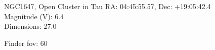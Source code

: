 \begin{block}{NGC1647, Open Cluster in Tau}
    RA: 04:45:55.57, Dec: +19:05:42.4 \\ 
    Magnitude (V): 6.4 \\ 
    Dimensions: 27.0 

    Finder fov: 60 
\end{block}